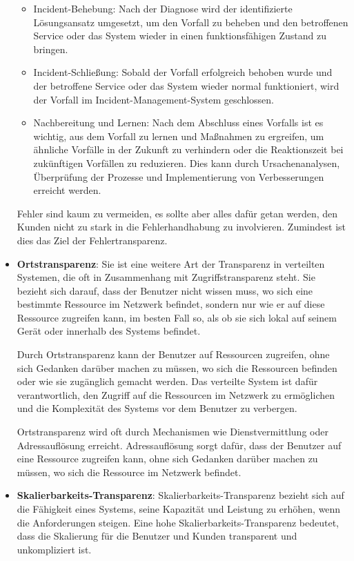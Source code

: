 \documentclass[../vs-script-first-v01.tex]{subfiles}
\begin{document}
\begin{itemize}
\begin{itemize}
\item Incident-Behebung: Nach der Diagnose wird der identifizierte Lösungsansatz umgesetzt, um den Vorfall zu beheben und den betroffenen Service oder das System wieder in einen funktionsfähigen Zustand zu bringen.
\item Incident-Schließung: Sobald der Vorfall erfolgreich behoben wurde und der betroffene Service oder das System wieder normal funktioniert, wird der Vorfall im Incident-Management-System geschlossen.
\item Nachbereitung und Lernen: Nach dem Abschluss eines Vorfalls ist es wichtig, aus dem Vorfall zu lernen und Maßnahmen zu ergreifen, um ähnliche Vorfälle in der Zukunft zu verhindern oder die Reaktionszeit bei zukünftigen Vorfällen zu reduzieren. Dies kann durch Ursachenanalysen, Überprüfung der Prozesse und Implementierung von Verbesserungen erreicht werden.
\end{itemize}
Fehler sind kaum zu vermeiden, es sollte aber alles dafür getan werden, den Kunden nicht zu stark in die Fehlerhandhabung zu involvieren. Zumindest ist dies das Ziel der Fehlertransparenz.

\item \textbf{Ortstransparenz}: Sie ist eine weitere Art der Transparenz in verteilten Systemen, die oft in Zusammenhang mit Zugriffstransparenz steht. Sie bezieht sich darauf, dass der Benutzer nicht wissen muss, wo sich eine bestimmte Ressource im Netzwerk befindet, sondern nur wie er auf diese Ressource zugreifen kann, im besten Fall so, als ob sie sich lokal auf seinem Gerät oder innerhalb des Systems befindet.

Durch Ortstransparenz kann der Benutzer auf Ressourcen zugreifen, ohne sich Gedanken darüber machen zu müssen, wo sich die Ressourcen befinden oder wie sie zugänglich gemacht werden. Das verteilte System ist dafür verantwortlich, den Zugriff auf die Ressourcen im Netzwerk zu ermöglichen und die Komplexität des Systems vor dem Benutzer zu verbergen.

Ortstransparenz wird oft durch Mechanismen wie Dienstvermittlung oder Adressauflösung erreicht. Adressauflösung sorgt dafür, dass der Benutzer auf eine Ressource zugreifen kann, ohne sich Gedanken darüber machen zu müssen, wo sich die Ressource im Netzwerk befindet. 

\item \textbf{Skalierbarkeits-Transparenz}: Skalierbarkeits-Transparenz bezieht sich auf die Fähigkeit eines Systems, seine Kapazität und Leistung zu erhöhen, wenn die Anforderungen steigen. Eine hohe Skalierbarkeits-Transparenz bedeutet, dass die Skalierung für die Benutzer und Kunden transparent und unkompliziert ist.


\end{itemize}
\end{document}
